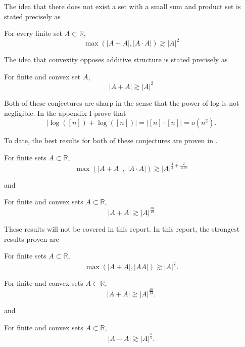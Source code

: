 \documentclass[12pt,reqno]{amsart}
\begin{document}
The idea that there does not exist a set with a small sum and product set is
stated precisely as
\begin{conjecture}
For every finite set \(A \subset \mathbb{R} \),
\[
    \max \left( \left\lvert A+A \right\rvert, \left\lvert A \cdot A \right\rvert  \right) \gtrsim   \left\lvert A \right\rvert^{2}
\]
\end{conjecture}

The idea that convexity opposes additive structure is stated precisely as

\begin{conjecture}
    For finite and convex set \(A\),
    \[
        \left\lvert A+A \right\rvert \gtrsim   \left\lvert A \right\rvert ^{2}
    \]
\end{conjecture}

Both of these conjectures are sharp in the sense that the power of log is not negligible. In the appendix I prove that
\[
    \left\lvert \log \left( [n] \right) + \log \left( [n] \right)  \right\rvert = \left\lvert [n]\cdot [n] \right\rvert = o (n^{2})
.\]

To date, the best results for both of these conjectures are proven in \cite{stevens-rudnev}.
\begin{theorem}
    For finite sets \(A \subset \mathbb{R} \),
    \[
        \max \left( \left\lvert A+A \right\rvert ~,~ \left\lvert A \cdot A \right\rvert  \right) \gtrsim    \left\lvert A \right\rvert^{\frac{4}{3} + \frac{2}{1167}}
    \]
\end{theorem}
and
\begin{theorem}
    For finite and convex sets \(A \subset \mathbb{R} \),
    \[
        \left\lvert A+A \right\rvert \gtrsim   \left\lvert A \right\rvert ^{\frac{30}{19} }
    \]
\end{theorem}

These results will not be covered in this report. In this report,
the strongest results proven are
\begin{theorem}\label{thm:solymosi-sp}
For finite sets \(A \subset \mathbb{R} \),
\[
    \max \left( \left\lvert A+A \right\rvert , \left\lvert AA \right\rvert  \right) \gtrsim \left\lvert A \right\rvert ^{\frac{4}{3} }
.\]
\end{theorem}
\begin{theorem}\label{thm:shkredov-sum}
For finite and convex sets \(A \subset \mathbb{R} \),
\[
    \left\lvert A + A \right\rvert \gtrsim  \left\lvert A \right\rvert ^{\frac{20}{13}  }
.\]
\end{theorem}
and
\begin{theorem}\label{thm:shkredov-diff}
For finite and convex sets \(A \subset \mathbb{R} \),
\[
    \left\lvert A - A \right\rvert \gtrsim \left\lvert A \right\rvert ^{\frac{8}{5} }
.\]
\end{theorem}
\end{document}
